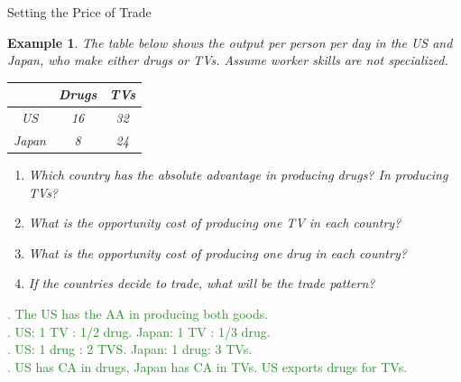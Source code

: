 \documentclass[xcolor={dvipsnames},pdf, hyperref={colorlinks=true, citecolor=ForestGreen, linkcolor=BlueViolet, urlcolor=Magenta}]{beamer}
\newtheorem{exmp}{Example}[section]
\theoremstyle{definition}
\newcommand{\ddp}[1]{{\textcolor{ForestGreen}{#1}}}
\begin{document}
\begin{frame}[t]{Setting the Price of Trade}
	\begin{exmp}
		\scriptsize
		The table below shows the output per person per day in the US and Japan, who make either drugs or TVs. Assume worker skills are not specialized. 
		
		\begin{table}
			\begin{tabular}{c| c |c }
				& Drugs & TVs  \\
				\hline 
				US & 16 & 32 \\ 
				Japan & 8 & 24 \\
			\end{tabular}
		\end{table}
	\begin{enumerate}
		\item Which country has the absolute advantage in producing drugs? In producing TVs?
		\item What is the opportunity cost of producing one TV in each country?
		\item What is the opportunity cost of producing one drug in each country?
		\item If the countries decide to trade, what will be the trade pattern?
	\end{enumerate}
	\end{exmp}
	\scriptsize
\ddp{. The US has the AA in producing both goods.\\
	\pause	2. US: 1 TV : 1/2 drug. Japan: 1 TV : 1/3 drug. \\
	\pause	3. US: 1 drug : 2 TVS. Japan: 1 drug: 3 TVs. \\
	\pause	4. US has CA in drugs, Japan has CA in TVs. US exports drugs for TVs.}
\end{frame}
\end{document}
